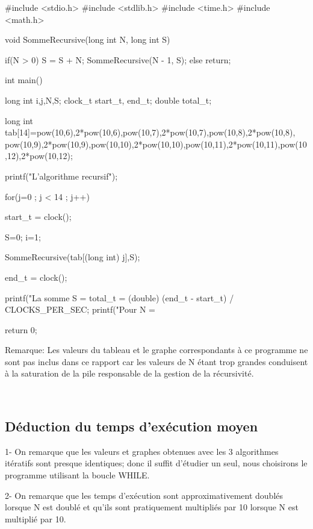 \documentclass[•]{article}
\begin{document}
\begin{sql}
#include <stdio.h>
#include <stdlib.h>
#include <time.h>
#include <math.h>

void SommeRecursive(long int N, long int S)
{
	if(N > 0)
	{
		S = S + N;
		SommeRecursive(N - 1, S);
	}
	else{
        return;
	}

}


int main()
{

	long int i,j,N,S;
	clock_t start_t, end_t;
    double total_t;

	long int tab[14]={pow(10,6),2*pow(10,6),pow(10,7),2*pow(10,7),pow(10,8),2*pow(10,8),
	pow(10,9),2*pow(10,9),pow(10,10),2*pow(10,10),pow(10,11),2*pow(10,11),pow(10,12),2*pow(10,12)};

	printf("L'algorithme recursif\n");

	for(j=0 ; j < 14 ; j++) {

        start_t = clock();

        S=0; i=1;

        SommeRecursive(tab[(long int) j],S);

        end_t = clock();

        printf("La somme S = %
        total_t = (double) (end_t - start_t) / CLOCKS_PER_SEC;
        printf("Pour N = %
    }


    return 0;
}

\end{sql}

\color{red}
Remarque: 
\color{black}
Les valeurs du tableau et le graphe correspondants à ce programme ne sont pas inclus dans ce rapport car les valeurs de N étant trop grandes conduisent à la saturation de la pile responsable de la gestion de la récursivité.

\textrm{ }
\\
\subsection{Déduction du temps d'exécution moyen}

1- On remarque que les valeurs et graphes obtenues avec les 3 algorithmes itératifs sont presque identiques;
donc il suffit d'étudier un seul, nous choisirons le programme utilisant la boucle WHILE.

2- On remarque que les temps d'exécution sont approximativement doublés lorsque N est doublé et qu'ils sont pratiquement multipliés par 10 lorsque N est multiplié par 10.
\\
\end{document}
